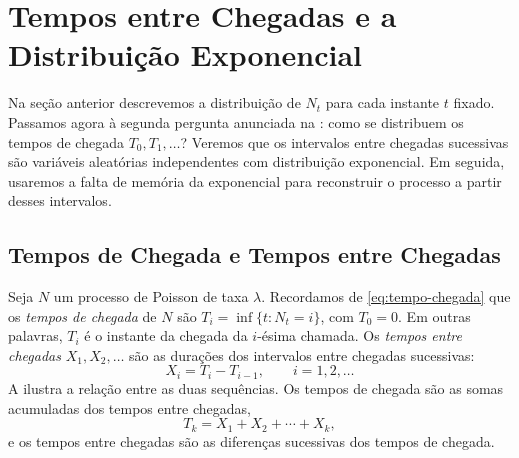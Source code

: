 \documentclass[12pt,portuguese]{article}
\theoremstyle{definition}
\theoremstyle{plainexercise}
\theoremstyle{starredexercise}
\theoremstyle{definition}
\begin{document}
\section{Tempos entre Chegadas e a Distribuição Exponencial}
\label{sec:tempos-chegada}

Na seção anterior descrevemos a distribuição de $N_t$ para cada instante $t$
fixado. Passamos agora à segunda pergunta anunciada na
: como se distribuem os tempos de chegada
$T_0,T_1,\ldots$? Veremos que os intervalos entre chegadas sucessivas são
variáveis aleatórias independentes com distribuição exponencial. Em seguida,
usaremos a falta de memória da exponencial para reconstruir o processo a
partir desses intervalos.

\subsection{Tempos de Chegada e Tempos entre Chegadas}
\label{subsec:tempos-entre-chegadas}

Seja $N$ um processo de Poisson de taxa $\lambda$. Recordamos de
\eqref{eq:tempo-chegada} que os \emph{tempos de chegada} de $N$ são
$T_i=\inf\{t:N_t=i\}$, com $T_0=0$. Em outras palavras, $T_i$ é o instante da
chegada da $i$-ésima chamada. Os \emph{tempos entre chegadas} $X_1,X_2,\ldots$
são as durações dos intervalos entre chegadas sucessivas:
\begin{equation}\label{eq:tempo-entre-chegadas}
  X_i=T_i-T_{i-1},
  \qquad i=1,2,\ldots
\end{equation}
A  ilustra a relação entre as duas sequências.
Os tempos de chegada são as somas acumuladas dos tempos entre chegadas,
\[
  T_k=X_1+X_2+\cdots+X_k,
\]
e os tempos entre chegadas são as diferenças sucessivas dos tempos de chegada.
\end{document}
